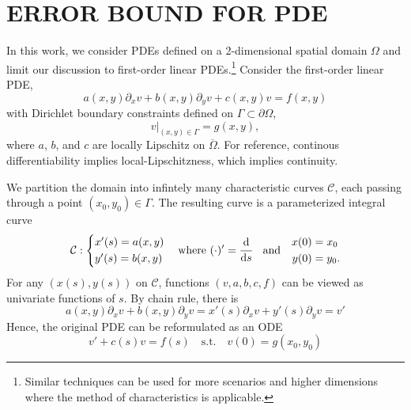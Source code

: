 \documentclass[accepted]{uai2023}
\newcommand{\ds}[1]{\cfrac{\mathrm{d} #1}{\mathrm{d} s}}
\begin{document}
\section{ERROR BOUND FOR PDE}
    In this work, we consider PDEs defined on a 2-dimensional spatial domain $\Omega$ and limit our discussion to first-order linear PDEs.\footnote{Similar techniques can be used for more scenarios and higher dimensions where the method of characteristics is applicable.} 
    Consider the first-order linear PDE,
    { \small
        \begin{equation}\label{eq:pde-master}
            a(x, y) \partial_x v + b(x, y) \partial_y v + c(x, y)v = f(x, y)
        \end{equation}
    }
    with Dirichlet boundary constraints defined on $\Gamma \subset \partial \Omega$,
    {
        \small
        \begin{equation}\label{eq:pde-bc-master}
            v\big|_{(x, y) \in \Gamma} = g(x, y),
        \end{equation}
    }
    where $a$, $b$, and $c$ are locally Lipschitz on $\overline\Omega$. For reference, continous differentiability implies local-Lipschitzness, which implies continuity.

    We partition the domain into infintely many characteristic curves $\mathcal{C}$, each passing through a point $(x_0, y_0) \in \Gamma$. The resulting curve is a parameterized integral curve 
    {
        \small
        \begin{equation*} 
            \mathcal{C}: \begin{cases*}
                x'(s) = a(x, y) \\
                y'(s) = b(x, y) 
            \end{cases*} 
            \quad
            \text{where}
            \,\,
            (\cdot)' = \ds{}
            \quad
            \text{and} 
            \quad
            \begin{aligned}
                x(0) &= x_0 \\
                y(0) &= y_0.
            \end{aligned}
        \end{equation*}
    }
    For any $(x(s), y(s))$ on $\mathcal{C}$, functions $(v, a, b, c, f)$ can be viewed as univariate functions of $s$. By chain rule, there is
    {
        \small
        \begin{equation*}
            a(x, y)\partial_x v + b(x, y)\partial_y v = x'(s)\partial_x v  + y'(s)\partial_y v = v'
        \end{equation*}
    }
    Hence, the original PDE can be reformulated as an ODE
    {
        \small
        \begin{equation}
            v' + c(s)v = f(s) \quad \text{s.t.} \quad v(0) = g(x_0, y_0)
        \end{equation}
    }
\end{document}
